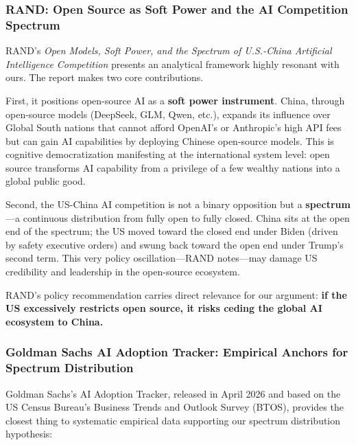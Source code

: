﻿\documentclass[12pt,a4paper]{article}
\begin{document}
\subsubsection{RAND: Open Source as Soft Power and the AI Competition Spectrum}

RAND's \textit{Open Models, Soft Power, and the Spectrum of U.S.-China Artificial Intelligence Competition} presents an analytical framework highly resonant with ours. The report makes two core contributions.

First, it positions open-source AI as a \textbf{soft power instrument}. China, through open-source models (DeepSeek, GLM, Qwen, etc.), expands its influence over Global South nations that cannot afford OpenAI's or Anthropic's high API fees but can gain AI capabilities by deploying Chinese open-source models. This is cognitive democratization manifesting at the international system level: open source transforms AI capability from a privilege of a few wealthy nations into a global public good.

Second, the US-China AI competition is not a binary opposition but a \textbf{spectrum}---a continuous distribution from fully open to fully closed. China sits at the open end of the spectrum; the US moved toward the closed end under Biden (driven by safety executive orders) and swung back toward the open end under Trump's second term. This very policy oscillation---RAND notes---may damage US credibility and leadership in the open-source ecosystem.

RAND's policy recommendation carries direct relevance for our argument: \textbf{if the US excessively restricts open source, it risks ceding the global AI ecosystem to China.}

\subsubsection{Goldman Sachs AI Adoption Tracker: Empirical Anchors for Spectrum Distribution}

Goldman Sachs's AI Adoption Tracker, released in April 2026 and based on the US Census Bureau's Business Trends and Outlook Survey (BTOS), provides the closest thing to systematic empirical data supporting our spectrum distribution hypothesis:
\end{document}
